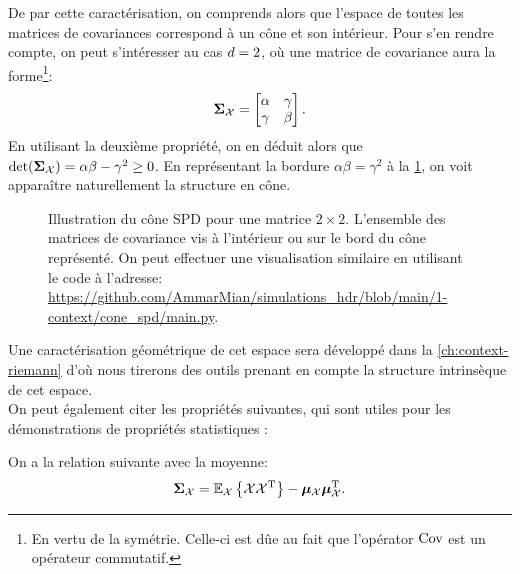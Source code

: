 \begin{remark}
De par cette caractérisation, on comprends alors que l'espace de toutes les matrices de covariances correspond à un cône et son intérieur. Pour s'en rendre compte, on peut s'intéresser au cas $d=2$, où une matrice de covariance aura la forme\footnote{En vertu de la symétrie. Celle-ci est dûe au fait que l'opérator $\operatorname{\operatorname{Cov}}$ est un opérateur commutatif.}:
$$
\boldsymbol{\Sigma}_{\mathcal{X}} = \begin{bmatrix} \alpha & \gamma \\ \gamma & \beta \end{bmatrix}.
$$
En utilisant la deuxième propriété, on en déduit alors que $\operatorname{\operatorname{det}}(\boldsymbol{\Sigma}_{\mathcal{X}}) = \alpha\beta - \gamma^2 \geq 0$. En représentant la bordure $\alpha\beta=\gamma^2$ à la \cref{fig:context-figure-spdcone}, on voit apparaître naturellement la structure en cône.


\end{remark}

\begin{figure}[h]
    \begin{center}
    
  \end{center}
  \caption{Illustration du cône SPD pour une matrice $2\times 2$. L'ensemble des matrices de covariance vis à l'intérieur ou sur le bord du cône représenté. On peut effectuer une visualisation similaire en utilisant le code à l'adresse: \url{https://github.com/AmmarMian/simulations_hdr/blob/main/1-context/cone_spd/main.py}.}\label{fig:context-figure-spdcone}
  \end{figure}

Une caractérisation géométrique de cet espace sera développé dans la \cref{ch:context-riemann} d'où nous tirerons des outils prenant en compte la structure intrinsèque de cet espace. \\


On peut également citer les propriétés suivantes, qui sont utiles pour les démonstrations de propriétés statistiques :

\begin{property}
  \label{prop:context-definition-linkmoy}
  On a la relation suivante avec la moyenne:
  \begin{equation}
    \boldsymbol{\Sigma}_{\mathcal{X}} = \operatorname{\mathbb{E}}_{\mathcal{X}}\left\{ \mathcal{X}\mathcal{X}^{\mathrm{T}} \right\} - \boldsymbol{\mu}_{\mathcal{X}}\boldsymbol{\mu}_{\mathcal{X}}^{\mathrm{T}}.
    \label{eq:context-definition-linkmoy}
  \end{equation}

\end{property}

